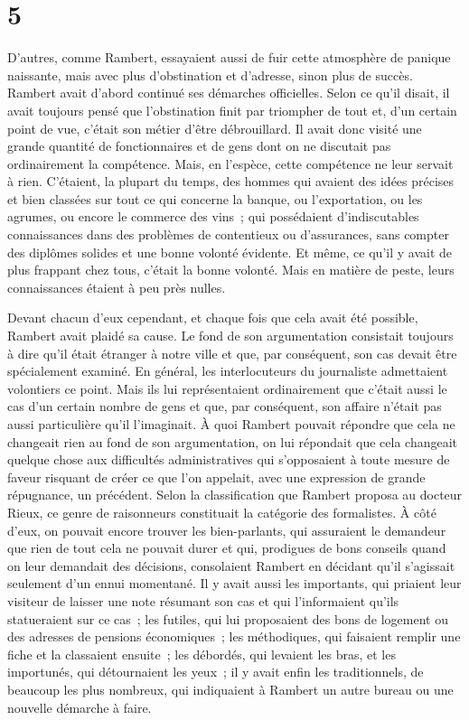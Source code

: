 \documentclass[french,twoside]{book} %
\begin{document}
\section[{5}]{5}
\noindent D’autres, comme Rambert, essayaient aussi de fuir cette atmosphère de panique naissante, mais avec plus d’obstination et d’adresse, sinon plus de succès. Rambert avait d’abord continué ses démarches officielles. Selon ce qu’il disait, il avait toujours pensé que l’obstination finit par triompher de tout et, d’un certain point de vue, c’était son métier d’être débrouillard. Il avait donc visité une grande quantité de fonctionnaires et de gens dont on ne discutait pas ordinairement la compétence. Mais, en l’espèce, cette compétence ne leur servait à rien. C’étaient, la plupart du temps, des hommes qui avaient des idées précises et bien classées sur tout ce qui concerne la banque, ou l’exportation, ou les agrumes, ou encore le commerce des vins ; qui possédaient d’indiscutables connaissances dans des problèmes de contentieux ou d’assurances, sans compter des diplômes solides et une bonne volonté évidente. Et même, ce qu’il y avait de plus frappant chez tous, c’était la bonne volonté. Mais en matière de peste, leurs connaissances étaient à peu près nulles.\par
Devant chacun d’eux cependant, et chaque fois que cela avait été possible, Rambert avait plaidé sa cause. Le fond de son argumentation consistait toujours à dire qu’il était étranger à notre ville et que, par conséquent, son cas devait être spécialement examiné. En général, les interlocuteurs du journaliste admettaient volontiers ce point. Mais ils lui représentaient ordinairement que c’était aussi le cas d’un certain nombre de gens et que, par conséquent, son affaire n’était pas aussi particulière qu’il l’imaginait. À quoi Rambert pouvait répondre que cela ne changeait rien au fond de son argumentation, on lui répondait que cela changeait quelque chose aux difficultés administratives qui s’opposaient à toute mesure de faveur risquant de créer ce que l’on appelait, avec une expression de grande répugnance, un précédent. Selon la classification que Rambert proposa au docteur Rieux, ce genre de raisonneurs constituait la catégorie des formalistes. À côté d’eux, on pouvait encore trouver les bien-parlants, qui assuraient le demandeur que rien de tout cela ne pouvait durer et qui, prodigues de bons conseils quand on leur demandait des décisions, consolaient Rambert en décidant qu’il s’agissait seulement d’un ennui momentané. Il y avait aussi les importants, qui priaient leur visiteur de laisser une note résumant son cas et qui l’informaient qu’ils statueraient sur ce cas ; les futiles, qui lui proposaient des bons de logement ou des adresses de pensions économiques ; les méthodiques, qui faisaient remplir une fiche et la classaient ensuite ; les débordés, qui levaient les bras, et les importunés, qui détournaient les yeux ; il y avait enfin les traditionnels, de beaucoup les plus nombreux, qui indiquaient à Rambert un autre bureau ou une nouvelle démarche à faire.\par
\end{document}
